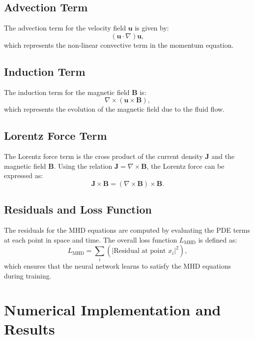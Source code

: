 \documentclass[12pt]{article}
\begin{document}
\subsection{Advection Term}
The advection term for the velocity field \( \mathbf{u} \) is given by:
\begin{equation}
(\mathbf{u} \cdot \nabla) \mathbf{u},
\end{equation}
which represents the non-linear convective term in the momentum equation.

\subsection{Induction Term}
The induction term for the magnetic field \( \mathbf{B} \) is:
\begin{equation}
\nabla \times (\mathbf{u} \times \mathbf{B}),
\end{equation}
which represents the evolution of the magnetic field due to the fluid flow.

\subsection{Lorentz Force Term}
The Lorentz force term is the cross product of the current density \( \mathbf{J} \) and the magnetic field \( \mathbf{B} \). Using the relation \( \mathbf{J} = \nabla \times \mathbf{B} \), the Lorentz force can be expressed as:
\begin{equation}
\mathbf{J} \times \mathbf{B} = (\nabla \times \mathbf{B}) \times \mathbf{B}.
\end{equation}

\subsection{Residuals and Loss Function}
The residuals for the MHD equations are computed by evaluating the PDE terms at each point in space and time. The overall loss function \( L_{\text{MHD}} \) is defined as:
\begin{equation}
L_{\text{MHD}} = \sum_i \left( \left| \text{Residual at point } x_i \right|^2 \right),
\end{equation}
which ensures that the neural network learns to satisfy the MHD equations during training.

\section{Numerical Implementation and Results}
\end{document}
